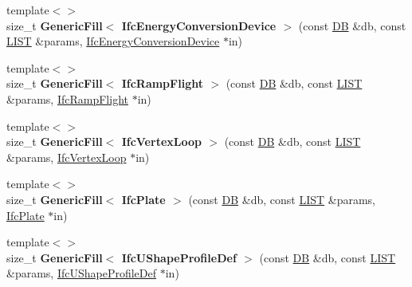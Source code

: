 \begin{DoxyCompactItemize}
\item 
\hypertarget{namespace_assimp_1_1_s_t_e_p_a122b3f69d436509efe69d5abf6e132d2}{{\footnotesize template$<$$>$ }\\size\+\_\+t {\bfseries Generic\+Fill$<$ Ifc\+Energy\+Conversion\+Device $>$} (const \hyperlink{class_assimp_1_1_s_t_e_p_1_1_d_b}{D\+B} \&db, const \hyperlink{class_assimp_1_1_s_t_e_p_1_1_e_x_p_r_e_s_s_1_1_l_i_s_t}{L\+I\+S\+T} \&params, \hyperlink{struct_assimp_1_1_i_f_c_1_1_ifc_energy_conversion_device}{Ifc\+Energy\+Conversion\+Device} $\ast$in)}\label{namespace_assimp_1_1_s_t_e_p_a122b3f69d436509efe69d5abf6e132d2}

\item 
\hypertarget{namespace_assimp_1_1_s_t_e_p_a5f02706c301221d5a310cd12954c9eb9}{{\footnotesize template$<$$>$ }\\size\+\_\+t {\bfseries Generic\+Fill$<$ Ifc\+Ramp\+Flight $>$} (const \hyperlink{class_assimp_1_1_s_t_e_p_1_1_d_b}{D\+B} \&db, const \hyperlink{class_assimp_1_1_s_t_e_p_1_1_e_x_p_r_e_s_s_1_1_l_i_s_t}{L\+I\+S\+T} \&params, \hyperlink{struct_assimp_1_1_i_f_c_1_1_ifc_ramp_flight}{Ifc\+Ramp\+Flight} $\ast$in)}\label{namespace_assimp_1_1_s_t_e_p_a5f02706c301221d5a310cd12954c9eb9}

\item 
\hypertarget{namespace_assimp_1_1_s_t_e_p_a7b7d4b6d176dd93d8e3aba2843c04fc9}{{\footnotesize template$<$$>$ }\\size\+\_\+t {\bfseries Generic\+Fill$<$ Ifc\+Vertex\+Loop $>$} (const \hyperlink{class_assimp_1_1_s_t_e_p_1_1_d_b}{D\+B} \&db, const \hyperlink{class_assimp_1_1_s_t_e_p_1_1_e_x_p_r_e_s_s_1_1_l_i_s_t}{L\+I\+S\+T} \&params, \hyperlink{struct_assimp_1_1_i_f_c_1_1_ifc_vertex_loop}{Ifc\+Vertex\+Loop} $\ast$in)}\label{namespace_assimp_1_1_s_t_e_p_a7b7d4b6d176dd93d8e3aba2843c04fc9}

\item 
\hypertarget{namespace_assimp_1_1_s_t_e_p_a0bc5782a546f6ebc58506dde09c05b89}{{\footnotesize template$<$$>$ }\\size\+\_\+t {\bfseries Generic\+Fill$<$ Ifc\+Plate $>$} (const \hyperlink{class_assimp_1_1_s_t_e_p_1_1_d_b}{D\+B} \&db, const \hyperlink{class_assimp_1_1_s_t_e_p_1_1_e_x_p_r_e_s_s_1_1_l_i_s_t}{L\+I\+S\+T} \&params, \hyperlink{struct_assimp_1_1_i_f_c_1_1_ifc_plate}{Ifc\+Plate} $\ast$in)}\label{namespace_assimp_1_1_s_t_e_p_a0bc5782a546f6ebc58506dde09c05b89}

\item 
\hypertarget{namespace_assimp_1_1_s_t_e_p_ad9f612db00a43516c743cfcf9d8b238f}{{\footnotesize template$<$$>$ }\\size\+\_\+t {\bfseries Generic\+Fill$<$ Ifc\+U\+Shape\+Profile\+Def $>$} (const \hyperlink{class_assimp_1_1_s_t_e_p_1_1_d_b}{D\+B} \&db, const \hyperlink{class_assimp_1_1_s_t_e_p_1_1_e_x_p_r_e_s_s_1_1_l_i_s_t}{L\+I\+S\+T} \&params, \hyperlink{struct_assimp_1_1_i_f_c_1_1_ifc_u_shape_profile_def}{Ifc\+U\+Shape\+Profile\+Def} $\ast$in)}\label{namespace_assimp_1_1_s_t_e_p_ad9f612db00a43516c743cfcf9d8b238f}


\end{DoxyCompactItemize}
